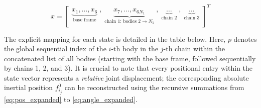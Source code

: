 \begin{equation}
    x =
    \begin{bmatrix}
        \underbrace{x_1, \ldots, x_6}_{\text{base frame}} \;,\;
        \underbrace{x_7, \ldots, x_{6N_1}}_{\text{chain 1: bodies } 2 \to N_1} \;,\;
        \underbrace{\ldots}_{\text{chain 2}} \;,\;
        \underbrace{\ldots}_{\text{chain 3}}
    \end{bmatrix}^T
\end{equation}

The explicit mapping for each state is detailed in the table below. Here, $p$ denotes the global sequential index of the $i$-th body in the $j$-th chain within the concatenated list of all bodies (starting with the base frame, followed sequentially by chains 1, 2, and 3). It is crucial to note that every positional entry within the state vector represents a \emph{relative} joint displacement; the corresponding absolute inertial position $f^0_{i_j}$ can be reconstructed using the recursive summations from \eqref{eq:pos_expanded} to \eqref{eq:angle_expanded}.

